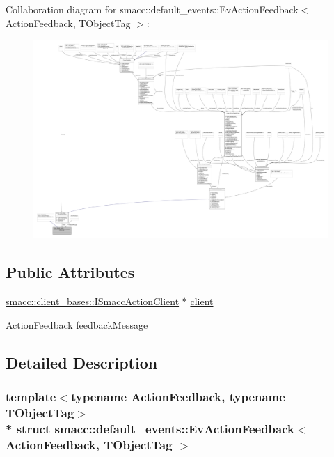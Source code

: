 Collaboration diagram for smacc\+:\+:default\+\_\+events\+:\+:Ev\+Action\+Feedback$<$ Action\+Feedback, T\+Object\+Tag $>$\+:
\nopagebreak
\begin{figure}[H]
\begin{center}
\leavevmode
\includegraphics[width=350pt]{structsmacc_1_1default__events_1_1EvActionFeedback__coll__graph}
\end{center}
\end{figure}
\subsection*{Public Attributes}
\begin{DoxyCompactItemize}
\item 
\hyperlink{classsmacc_1_1client__bases_1_1ISmaccActionClient}{smacc\+::client\+\_\+bases\+::\+I\+Smacc\+Action\+Client} $\ast$ \hyperlink{structsmacc_1_1default__events_1_1EvActionFeedback_a356e106d4c54e12dc81a0f3063ecff4a}{client}
\item 
Action\+Feedback \hyperlink{structsmacc_1_1default__events_1_1EvActionFeedback_aa04da2789df313666c6aa9480dc8287d}{feedback\+Message}
\end{DoxyCompactItemize}


\subsection{Detailed Description}
\subsubsection*{template$<$typename Action\+Feedback, typename T\+Object\+Tag$>$\\*
struct smacc\+::default\+\_\+events\+::\+Ev\+Action\+Feedback$<$ Action\+Feedback, T\+Object\+Tag $>$}



